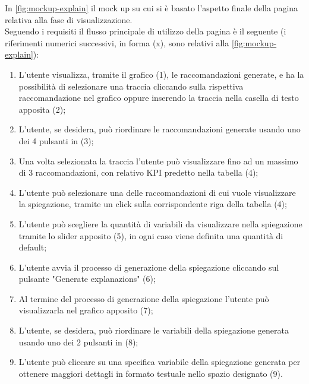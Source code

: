 In \autoref{fig:mockup-explain} il mock up su cui si è basato l'aspetto finale della pagina relativa alla fase di visualizzazione.
\\
Seguendo i requisiti il flusso principale di utilizzo della pagina è il seguente (i riferimenti numerici successivi, in forma (x), sono relativi alla \autoref{fig:mockup-explain}):

\begin{enumerate}
\item L'utente visualizza, tramite il grafico (1), le raccomandazioni generate, e ha la possibilità di selezionare una traccia cliccando sulla rispettiva raccomandazione nel grafico oppure inserendo la traccia nella casella di testo apposita (2);

\item L'utente, se desidera, può riordinare le raccomandazioni generate usando uno dei 4 pulsanti in (3);

\item Una volta selezionata la traccia l'utente può visualizzare fino ad un massimo di 3 raccomandazioni, con relativo KPI predetto nella tabella (4);

\item L'utente può selezionare una delle raccomandazioni di cui vuole visualizzare la spiegazione, tramite un click sulla corrispondente riga della tabella (4);

\item L'utente può scegliere la quantità di variabili da visualizzare nella spiegazione tramite lo slider apposito (5), in ogni caso viene definita una quantità di default;

\item L'utente avvia il processo di generazione della spiegazione cliccando sul pulsante "Generate explanazions" (6);

\item Al termine del processo di generazione della spiegazione l'utente può visualizzarla nel grafico apposito (7);

\item L'utente, se desidera, può riordinare le variabili della spiegazione generata usando uno dei 2 pulsanti in (8);

\item L'utente può cliccare su una specifica variabile della spiegazione generata per ottenere maggiori dettagli in formato testuale nello spazio designato (9).

\end{enumerate}





